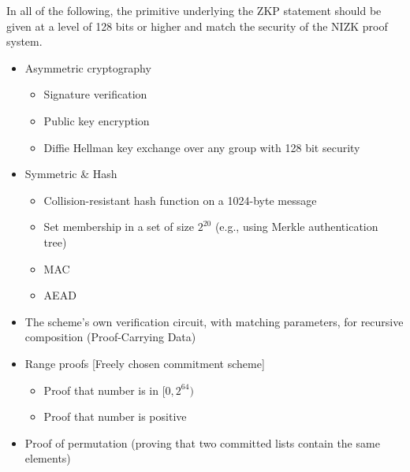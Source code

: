 In all of the following, the primitive underlying the ZKP statement should be given at a level of 128 bits or higher and match the security of the NIZK proof system.
\begin{itemize}
    \item Asymmetric cryptography
	\begin{itemize}
        \item Signature verification
        \item Public key encryption
        \item Diffie Hellman key exchange over any group with 128 bit security
	\end{itemize}
    \item Symmetric \& Hash
	\begin{itemize}
        \item Collision-resistant hash function on a 1024-byte message
        \item Set membership in a set of size $2^{20}$ (e.g., using Merkle authentication tree)
        \item MAC
        \item AEAD
	\end{itemize}
    \item The scheme's own verification circuit, with matching parameters, for recursive composition (Proof-Carrying Data)
    \item Range proofs [Freely chosen commitment scheme]
	\begin{itemize}
        \item Proof that number is in $[0, 2^{64})$ 
        \item Proof that number is positive
	\end{itemize}
    \item Proof of permutation (proving that two committed lists contain the same elements)
\end{itemize}
